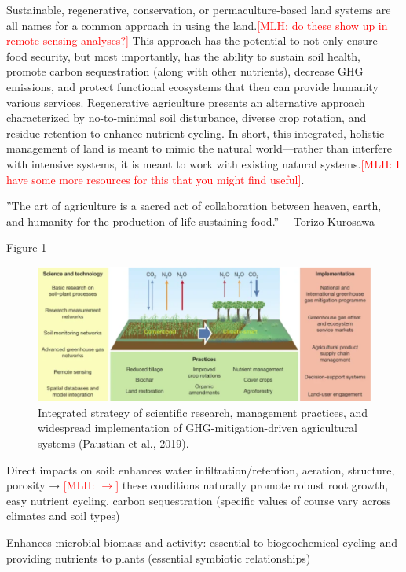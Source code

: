 \documentclass{book}\usepackage{knitr}
\newcommand{\red}[1]{\textcolor{red}{[MLH: #1]}}
\begin{document}
Sustainable, regenerative, conservation, or permaculture-based land systems are all names for a common approach in using the land.\red{do these show up in remote sensing analyses?} This approach has the potential to not only ensure food security, but most importantly, has the ability to sustain soil health, promote carbon sequestration (along with other nutrients), decrease GHG emissions, and protect functional ecosystems that then can provide humanity various services. Regenerative agriculture presents an alternative approach characterized by no-to-minimal soil disturbance, diverse crop rotation, and residue retention to enhance nutrient cycling. In short, this integrated, holistic management of land is meant to mimic the natural world—rather than interfere with intensive systems, it is meant to work with existing natural systems.\red{I have some more resources for this that you might find useful}.

''The art of agriculture is a sacred act of collaboration between heaven, earth, and humanity for the production of life-sustaining food.'' —Torizo Kurosawa

Figure \ref{fig:Climate-Smart-Soils}

\begin{figure}
\includegraphics[width=\linewidth]{images/land-use/Climate-Smart-Soils.png}
\caption{Integrated strategy of scientific research, management practices, and widespread implementation of GHG-mitigation-driven agricultural systems (Paustian et al., 2019).}
\label{fig:Climate-Smart-Soils}
\end{figure}

Direct impacts on soil: enhances water infiltration/retention, aeration, structure, porosity → \red{$\rightarrow$} these conditions naturally promote robust root growth, easy nutrient cycling, carbon sequestration (specific values of course vary across climates and soil types)

Enhances microbial biomass and activity: essential to biogeochemical cycling and providing nutrients to plants (essential symbiotic relationships)
\end{document}
